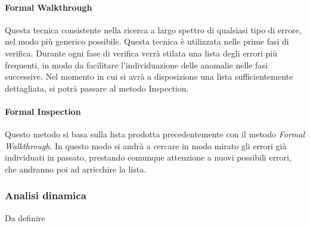 	\paragraph{{Formal Walkthrough}}
	Questa tecnica consistente nella ricerca a largo spettro di qualsiasi tipo di errore, nel modo più generico possibile. 
	Questa tecnica è utilizzata nelle prime fasi di verifica. Durante ogni fase di verifica verrà stilata una lista degli errori più frequenti, in modo da facilitare l’individuazione delle anomalie nelle fasi successive. 
	Nel momento in cui si avrà a disposizione una lista sufficientemente dettagliata, si potrà passare al metodo Inspection.
	
	
	\paragraph{{Formal Inspection}}
	Questo metodo si basa sulla lista prodotta precedentemente con il metodo \textit{Formal Walkthrough}. In questo modo si andrà a cercare in modo mirato gli errori già individuati in passato, prestando comunque attenzione a nuovi possibili errori, che andranno poi ad arricchire la lista.
	
	
	\subsubsection{Analisi dinamica}
	Da definire
	
	
	
	
	